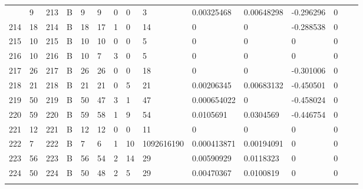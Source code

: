 \begin{longtable}{lllllllllllllll}
\begin{comment}
	213 & 9                 & 213 & B   & 9                 & 9                 & 0                 & 0    & 3          & 0.00325468     & 0.00648298     & -0.296296     & 0            \\
	214 & 18                & 214 & B   & 18                & 17                & 1                 & 0    & 14         & 0              & 0              & -0.288538     & 0            \\
	215 & 10                & 215 & B   & 10                & 10                & 0                 & 0    & 5          & 0              & 0              & 0             & 0            \\
	216 & 10                & 216 & B   & 10                & 7                 & 3                 & 0    & 5          & 0              & 0              & 0             & 0            \\
	217 & 26                & 217 & B   & 26                & 26                & 0                 & 0    & 18         & 0              & 0              & -0.301006     & 0            \\
	218 & 21                & 218 & B   & 21                & 21                & 0                 & 5    & 21         & 0.00206345     & 0.00683132     & -0.450501     & 0            \\
	219 & 50                & 219 & B   & 50                & 47                & 3                 & 1    & 47         & 0.000654022    & 0              & -0.458024     & 0            \\
	220 & 59                & 220 & B   & 59                & 58                & 1                 & 9    & 54         & 0.0105691      & 0.0304569      & -0.446754     & 0            \\
	221 & 12                & 221 & B   & 12                & 12                & 0                 & 0    & 11         & 0              & 0              & 0             & 0            \\
	222 & 7                 & 222 & B   & 7                 & 6                 & 1                 & 10   & 1092616190 & 0.000413871    & 0.00194091     & 0             & 0            \\
	223 & 56                & 223 & B   & 56                & 54                & 2                 & 14   & 29         & 0.00590929     & 0.0118323      & 0             & 0            \\
	224 & 50                & 224 & B   & 50                & 48                & 2                 & 5    & 29         & 0.00470367     & 0.0100819      & 0             & 0            \\

\end{comment}
\end{longtable}
